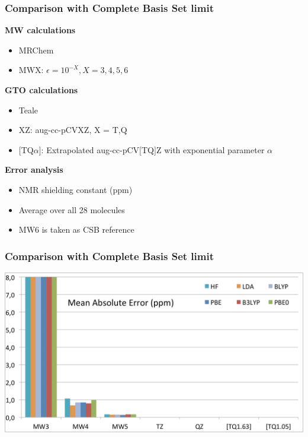 \begin{frame}
\frametitle{Comparison with Complete Basis Set limit}
\textbf{MW calculations}
\begin{itemize}
    \item   MRChem
    \item   MWX: $\epsilon=10^{-X}, X=3,4,5,6$
\end{itemize}

\vspace{5mm}

\textbf{GTO calculations}
\begin{itemize}
    \item   Teale \etal
    \item   XZ: aug-cc-pCVXZ, X = T,Q
    \item   $[$TQ$\alpha]$: Extrapolated aug-cc-pCV$[$TQ$]$Z with exponential
            parameter $\alpha$
\end{itemize}

\vspace{5mm}

\textbf{Error analysis}
\begin{itemize}
    \item   NMR shielding constant (ppm)
    \item   Average over all 28 molecules
    \item   MW6 is taken as CSB reference
\end{itemize}
\end{frame}

\begin{frame}
\frametitle{Comparison with Complete Basis Set limit}
\centering
\includegraphics[scale=0.3]{figures/mae_bas_1.pdf}
\end{frame}

